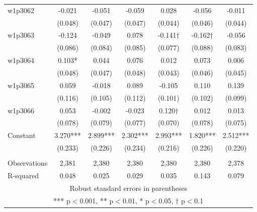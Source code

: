 \documentclass[]{article}
\begin{document}
\begin{tabular}{lcccccc}
w1p3062 & -0.021 & -0.051 & -0.059 & 0.028 & -0.056 & -0.011 \\
 & (0.048) & (0.047) & (0.047) & (0.044) & (0.046) & (0.044) \\
w1p3063 & -0.124 & -0.049 & 0.078 & -0.141† & -0.162† & -0.056 \\
 & (0.086) & (0.084) & (0.085) & (0.077) & (0.088) & (0.083) \\
w1p3064 & 0.103* & 0.044 & 0.076 & 0.012 & 0.073 & 0.006 \\
 & (0.048) & (0.047) & (0.048) & (0.043) & (0.046) & (0.045) \\
w1p3065 & 0.059 & -0.018 & 0.089 & -0.105 & 0.110 & 0.139 \\
 & (0.116) & (0.105) & (0.112) & (0.101) & (0.102) & (0.099) \\
w1p3066 & 0.053 & -0.002 & -0.023 & 0.120† & 0.012 & 0.013 \\
 & (0.078) & (0.079) & (0.077) & (0.070) & (0.078) & (0.075) \\
Constant & 3.270*** & 2.899*** & 2.302*** & 2.993*** & 1.820*** & 2.512*** \\
 & (0.233) & (0.226) & (0.234) & (0.216) & (0.226) & (0.220) \\
 &  &  &  &  &  &  \\
Observations & 2,381 & 2,380 & 2,380 & 2,380 & 2,380 & 2,378 \\
 R-squared & 0.048 & 0.025 & 0.029 & 0.035 & 0.143 & 0.079 \\ \hline
\multicolumn{7}{c}{ Robust standard errors in parentheses} \\
\multicolumn{7}{c}{ *** p$<$0.001, ** p$<$0.01, * p$<$0.05, † p$<$0.1} \\
\end{tabular}
\end{document}
